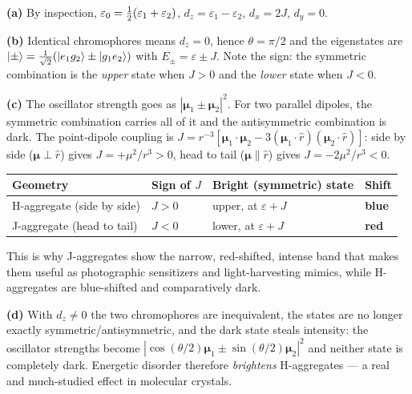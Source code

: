 \begin{solution}
\textbf{(a)} By inspection, $\varepsilon_0 = \tfrac{1}{2}(\varepsilon_1+\varepsilon_2)$,
$d_z = \varepsilon_1-\varepsilon_2$, $d_x = 2J$, $d_y = 0$.

\textbf{(b)} Identical chromophores means $d_z=0$, hence $\theta=\pi/2$ and the
eigenstates are $\ket{\pm} = \tfrac{1}{\sqrt2}\!\left(\ket{e_1g_2}\pm\ket{g_1e_2}\right)$
with $E_\pm = \varepsilon \pm J$. Note the sign: the symmetric combination is the
\emph{upper} state when $J>0$ and the \emph{lower} state when $J<0$.

\textbf{(c)} The oscillator strength goes as $|\bm{\mu}_1\pm\bm{\mu}_2|^2$. For two
parallel dipoles, the symmetric combination carries all of it and the antisymmetric
combination is dark. The point-dipole coupling is
$J = r^{-3}\!\left[\bm{\mu}_1\!\cdot\!\bm{\mu}_2 - 3(\bm{\mu}_1\!\cdot\!\hat{r})(\bm{\mu}_2\!\cdot\!\hat{r})\right]$:
side by side ($\bm{\mu}\perp\hat{r}$) gives $J=+\mu^2/r^3>0$, head to tail
($\bm{\mu}\parallel\hat{r}$) gives $J=-2\mu^2/r^3<0$.

\smallskip
\begin{center}\small
\begin{tabular}{@{}llll@{}}
\toprule
Geometry & Sign of $J$ & Bright (symmetric) state & Shift \\
\midrule
H-aggregate (side by side) & $J>0$ & upper, at $\varepsilon+J$ & \textbf{blue} \\
J-aggregate (head to tail) & $J<0$ & lower, at $\varepsilon+J$ & \textbf{red} \\
\bottomrule
\end{tabular}
\end{center}
\smallskip

\noindent
This is why J-aggregates show the narrow, red-shifted, intense band that makes them
useful as photographic sensitizers and light-harvesting mimics, while H-aggregates are
blue-shifted and comparatively dark.

\textbf{(d)} With $d_z\neq0$ the two chromophores are inequivalent, the states are no
longer exactly symmetric/antisymmetric, and the dark state steals intensity: the
oscillator strengths become $|\cos(\theta/2)\bm{\mu}_1 \pm \sin(\theta/2)\bm{\mu}_2|^2$
and neither state is completely dark. Energetic disorder therefore \emph{brightens}
H-aggregates --- a real and much-studied effect in molecular crystals.
\end{solution}

